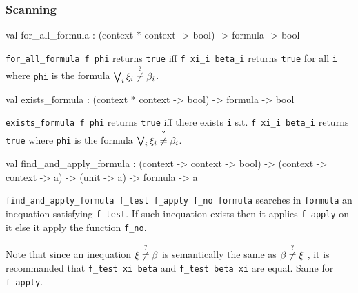 \subsubsection{Scanning}




\label{val:Recipe.for-underscoreall-underscoreformula}\begin{ocamldoccode}
val for_all_formula : (context * context -> bool) -> formula -> bool
\end{ocamldoccode}
\begin{ocamldocdescription}
{\tt{for\_all\_formula f phi}} returns {\tt{true}} iff {\tt{f xi\_i beta\_i}} returns {\tt{true}} for all {\tt{i}}
    where {\tt{phi}} is the formula $\bigvee_i \xi_i \stackrel{?}{\neq} \beta_i$. 


\end{ocamldocdescription}




\label{val:Recipe.exists-underscoreformula}\begin{ocamldoccode}
val exists_formula : (context * context -> bool) -> formula -> bool
\end{ocamldoccode}
\begin{ocamldocdescription}
{\tt{exists\_formula f phi}} returns {\tt{true}} iff there exists {\tt{i}} s.t. {\tt{f xi\_i beta\_i}} returns {\tt{true}} 
    where {\tt{phi}} is the formula $\bigvee_i \xi_i \stackrel{?}{\neq} \beta_i$. 


\end{ocamldocdescription}




\label{val:Recipe.find-underscoreand-underscoreapply-underscoreformula}\begin{ocamldoccode}
val find_and_apply_formula :
  (context -> context -> bool) ->
  (context -> context -> {\textquotesingle}a) ->
  (unit -> {\textquotesingle}a) -> formula -> {\textquotesingle}a
\end{ocamldoccode}
\begin{ocamldocdescription}
{\tt{find\_and\_apply\_formula f\_test f\_apply f\_no formula}} searches in {\tt{formula}} an inequation satisfying {\tt{f\_test}}. 
   If such inequation exists then it applies {\tt{f\_apply}} on it else it apply the function {\tt{f\_no}}.


   Note that since an inequation $\xi \stackrel{?}{\neq} \beta$  is semantically the same as $\beta \stackrel{?}{\neq} \xi$ , it is recommanded that
   {\tt{f\_test xi beta}} and {\tt{f\_test beta xi}} are equal. Same for {\tt{f\_apply}}.


\end{ocamldocdescription}




